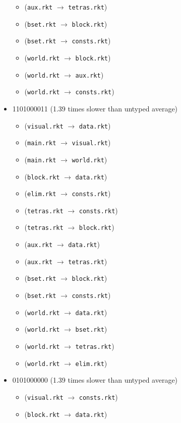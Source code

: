 \documentclass{article}
\newcommand{\mono}[1]{\texttt{#1}}
\begin{document}
\begin{itemize}
\begin{itemize}
  \item (\mono{aux.rkt} $\rightarrow$ \mono{tetras.rkt})
  \item (\mono{bset.rkt} $\rightarrow$ \mono{block.rkt})
  \item (\mono{bset.rkt} $\rightarrow$ \mono{consts.rkt})
  \item (\mono{world.rkt} $\rightarrow$ \mono{block.rkt})
  \item (\mono{world.rkt} $\rightarrow$ \mono{aux.rkt})
  \item (\mono{world.rkt} $\rightarrow$ \mono{consts.rkt})
  \end{itemize}
\item 1101000011 (1.39 times slower than untyped average)
  \begin{itemize}
  \item (\mono{visual.rkt} $\rightarrow$ \mono{data.rkt})
  \item (\mono{main.rkt} $\rightarrow$ \mono{visual.rkt})
  \item (\mono{main.rkt} $\rightarrow$ \mono{world.rkt})
  \item (\mono{block.rkt} $\rightarrow$ \mono{data.rkt})
  \item (\mono{elim.rkt} $\rightarrow$ \mono{consts.rkt})
  \item (\mono{tetras.rkt} $\rightarrow$ \mono{consts.rkt})
  \item (\mono{tetras.rkt} $\rightarrow$ \mono{block.rkt})
  \item (\mono{aux.rkt} $\rightarrow$ \mono{data.rkt})
  \item (\mono{aux.rkt} $\rightarrow$ \mono{tetras.rkt})
  \item (\mono{bset.rkt} $\rightarrow$ \mono{block.rkt})
  \item (\mono{bset.rkt} $\rightarrow$ \mono{consts.rkt})
  \item (\mono{world.rkt} $\rightarrow$ \mono{data.rkt})
  \item (\mono{world.rkt} $\rightarrow$ \mono{bset.rkt})
  \item (\mono{world.rkt} $\rightarrow$ \mono{tetras.rkt})
  \item (\mono{world.rkt} $\rightarrow$ \mono{elim.rkt})
  \end{itemize}
\item 0101000000 (1.39 times slower than untyped average)
  \begin{itemize}
  \item (\mono{visual.rkt} $\rightarrow$ \mono{consts.rkt})
  \item (\mono{block.rkt} $\rightarrow$ \mono{data.rkt})

\end{itemize}
\end{itemize}
\end{document}
